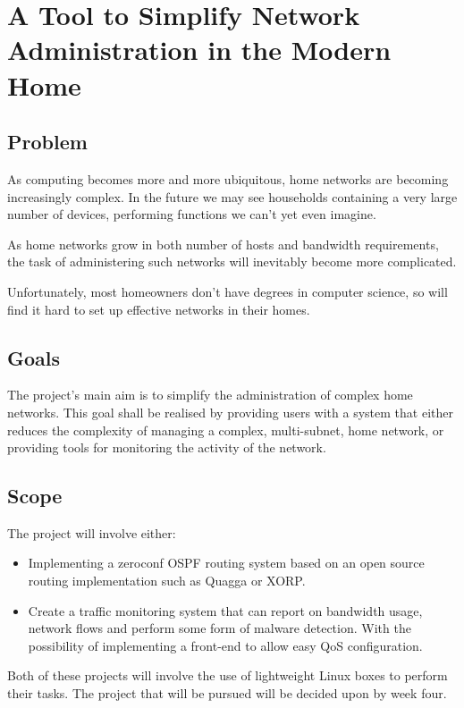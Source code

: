 \section*{A Tool to Simplify Network Administration in the Modern Home}

\subsection*{Problem}

As computing becomes more and more ubiquitous, home networks are becoming
increasingly complex. In the future we may see households containing a very
large number of devices, performing functions we can't yet even imagine. 

As home networks grow in both number of hosts and bandwidth requirements, the
task of administering such networks will inevitably become more complicated. 

Unfortunately, most homeowners don't have degrees in computer science, so will
find it hard to set up effective networks in their homes. 

\subsection*{Goals}

The project's main aim is to simplify the administration of complex home
networks. This goal shall be realised by providing users with a system that
either reduces the complexity of managing a complex, multi-subnet, home
network, or providing tools for monitoring the activity of the network. 

\subsection*{Scope}


The project will involve either:
\begin{itemize}
\item Implementing a zeroconf OSPF routing system based on an open source
  routing implementation such as Quagga or XORP.

\item Create a traffic monitoring system that can report on bandwidth usage,
  network flows and perform some form of malware detection. With the
  possibility of implementing a front-end to allow easy QoS configuration. 

\end{itemize}

Both of these projects will involve the use of lightweight Linux boxes to
perform their tasks. The project that will be pursued will be decided upon by
week four. 
